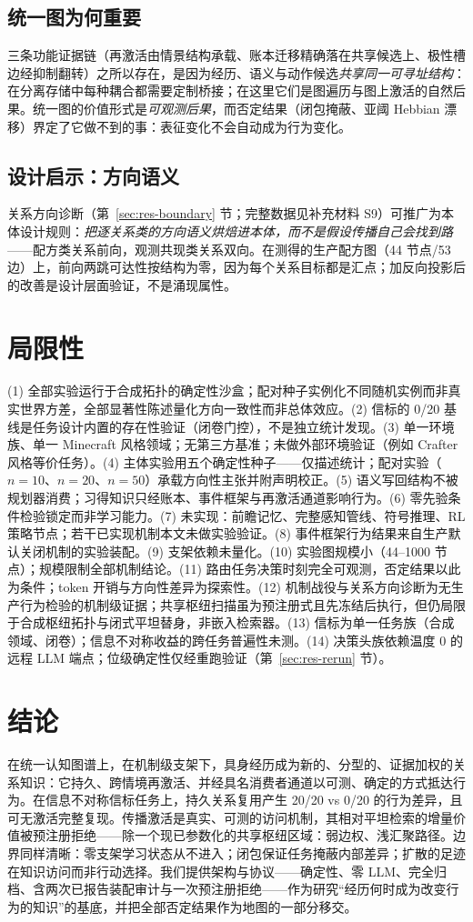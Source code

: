 \documentclass[10pt,a4paper]{ctexart}
\begin{document}
\subsection{统一图为何重要}
三条功能证据链（再激活由情景结构承载、账本迁移精确落在共享候选上、极性槽边经抑制翻转）之所以存在，是因为经历、语义与动作候选\emph{共享同一可寻址结构}：在分离存储中每种耦合都需要定制桥接；在这里它们是图遍历与图上激活的自然后果。统一图的价值形式是\emph{可观测后果}，而否定结果（闭包掩蔽、亚阈 Hebbian 漂移）界定了它做不到的事：表征变化不会自动成为行为变化。

\subsection{设计启示：方向语义}
关系方向诊断（第~\ref{sec:res-boundary} 节；完整数据见补充材料 S9）可推广为本体设计规则：\emph{把逐关系类的方向语义烘焙进本体，而不是假设传播自己会找到路}——配方类关系前向，观测共现类关系双向。在测得的生产配方图（44 节点/53 边）上，前向两跳可达性按结构为零，因为每个关系目标都是汇点；加反向投影后的改善是设计层面验证，不是涌现属性。

\section{局限性}
\label{sec:limits}
(1) 全部实验运行于合成拓扑的确定性沙盒；配对种子实例化不同随机实例而非真实世界方差，全部显著性陈述量化方向一致性而非总体效应。(2) 信标的 0/20 基线是任务设计内置的存在性验证（闭卷门控），不是独立统计发现。(3) 单一环境族、单一 Minecraft 风格领域；无第三方基准；未做外部环境验证（例如 Crafter 风格等价任务）。(4) 主体实验用五个确定性种子——仅描述统计；配对实验（$n{=}10$、$n{=}20$、$n{=}50$）承载方向性主张并附声明校正。(5) 语义写回结构不被规划器消费；习得知识只经账本、事件框架与再激活通道影响行为。(6) 零先验条件检验锁定而非学习能力。(7) 未实现：前瞻记忆、完整感知管线、符号推理、RL 策略节点；若干已实现机制本文未做实验验证。(8) 事件框架行为结果来自生产默认关闭机制的实验装配。(9) 支架依赖未量化。(10) 实验图规模小（44--1000 节点）；规模限制全部机制结论。(11) 路由任务决策时刻完全可观测，否定结果以此为条件；token 开销与方向性差异为探索性。(12) 机制战役与关系方向诊断为无生产行为检验的机制级证据；共享枢纽扫描虽为预注册式且先冻结后执行，但仍局限于合成枢纽拓扑与闭式平坦替身，非嵌入检索器。(13) 信标为单一任务族（合成领域、闭卷）；信息不对称收益的跨任务普遍性未测。(14) 决策头族依赖温度 0 的远程 LLM 端点；位级确定性仅经重跑验证（第~\ref{sec:res-rerun} 节）。

\section{结论}
在统一认知图谱上，在机制级支架下，具身经历成为新的、分型的、证据加权的关系知识：它持久、跨情境再激活、并经具名消费者通道以可测、确定的方式抵达行为。在信息不对称信标任务上，持久关系复用产生 20/20 vs 0/20 的行为差异，且可无激活完整复现。传播激活是真实、可测的访问机制，其相对平坦检索的增量价值被预注册拒绝——除一个现已参数化的共享枢纽区域：弱边权、浅汇聚路径。边界同样清晰：零支架学习状态从不进入；闭包保证任务掩蔽内部差异；扩散的足迹在知识访问而非行动选择。我们提供架构与协议——确定性、零 LLM、完全归档、含两次已报告装配审计与一次预注册拒绝——作为研究“经历何时成为改变行为的知识”的基底，并把全部否定结果作为地图的一部分移交。
\end{document}
